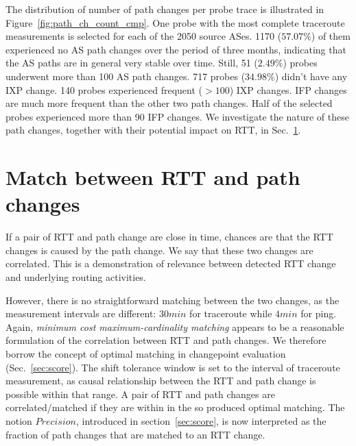 The distribution of number of path changes per probe trace
is illustrated in Figure~\ref{fig:path_ch_count_cmp}.
One probe with the most complete traceroute measurements is selected for each of the 2050 source ASes.
1170 ($57.07\%$) of them experienced no AS path changes over the period of three months, indicating that the AS paths are in general very stable over time.
Still, 51 ($2.49\%$) probes underwent more than 100 AS path changes.
717 probes ($34.98\%$) didn't have any IXP change.
140 probes experienced frequent ($> 100$) IXP changes.
IFP changes are much more frequent than the other two path changes. 
Half of the selected probes experienced more than 90 IFP changes.
We investigate the nature of these path changes, together with their potential impact on RTT, in Sec.~\ref{sec:corr}.

\section{Match between RTT and path changes}
\label{sec:corr}

If a pair of RTT and path change are close in time, chances are that the RTT changes is caused by the path change. We say that these two changes are correlated. This is a demonstration of relevance between detected RTT change and underlying routing activities.

However, there is no straightforward matching between the two changes, as the measurement intervals are different: $30min$ for traceroute while $4min$ for ping. 
Again, \textit{minimum cost maximum-cardinality matching} appears to be a reasonable formulation of the correlation between RTT and path changes.
We therefore borrow the concept of optimal matching in changepoint evaluation (Sec.~\ref{sec:score}).
The shift tolerance window is set to the interval of traceroute measurement, as causal relationship between the RTT and path change is possible within that range.
A pair of RTT and path changes are correlated/matched if they are within in the so produced optimal matching.
The notion $Precision$, introduced in section~\ref{sec:score}, is now interpreted as the fraction of path changes that are matched to an RTT change. 

